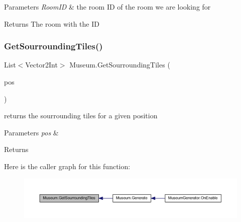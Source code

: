 \begin{DoxyParams}{Parameters}
{\em Room\+ID} & the room ID of the room we are looking for\\
\hline
\end{DoxyParams}
\begin{DoxyReturn}{Returns}
The room with the ID
\end{DoxyReturn}
\mbox{\label{class_museum_af5b732fe3a0821d02852171a73cf8f8b}} 
\subsubsection{\texorpdfstring{Get\+Sourrounding\+Tiles()}{GetSourroundingTiles()}}
{\footnotesize\ttfamily List$<$Vector2\+Int$>$ Museum.\+Get\+Sourrounding\+Tiles (\begin{DoxyParamCaption}\item[{Vector2\+Int}]{pos }\end{DoxyParamCaption})\hspace{0.3cm}{\ttfamily [private]}}



returns the sourrounding tiles for a given position 


\begin{DoxyParams}{Parameters}
{\em pos} & \\
\hline
\end{DoxyParams}
\begin{DoxyReturn}{Returns}

\end{DoxyReturn}
Here is the caller graph for this function\+:
\nopagebreak
\begin{figure}[H]
\begin{center}
\leavevmode
\includegraphics[width=350pt]{class_museum_af5b732fe3a0821d02852171a73cf8f8b_icgraph}
\end{center}
\end{figure}
\mbox{\label{class_museum_a6a161feedcbb8a471eb0e68b7e3e4027}} 
